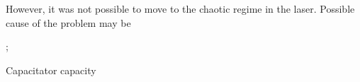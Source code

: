 However, it was not possible to move to the chaotic regime in the laser. Possible cause of the problem may be
\begin{itemize}
    ;
\end{itemize}

Capacitator capacity